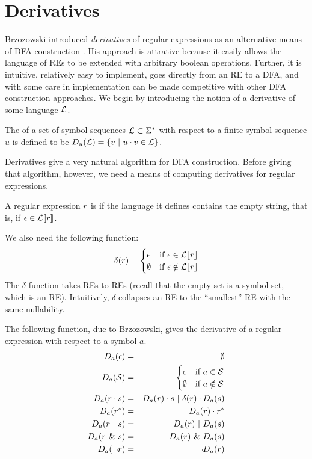 \section{Derivatives}\label{sec:derivatives}

Brzozowski introduced \emph{derivatives} of regular expressions as an alternative means of DFA construction \cite{derivatives}.  His approach is attrative because it easily allows the language of REs to be extended with arbitrary boolean operations.  Further, it is intuitive, relatively easy to implement, goes directly from an RE to a DFA, and with some care in implementation can be made competitive with other DFA construction approaches.  We begin by introducing the notion of a derivative of some language $\mathcal{L}$.

\begin{definition}  The  of a set of symbol sequences $\mathcal{L} \subset \Sigma^*$ with respect to a finite symbol sequence $u$ is defined to be $D_u(\mathcal{L}) = \{ v \ | \ u\cdot v \in \mathcal{L} \}$.
\end{definition} 

Derivatives give a very natural algorithm for DFA construction.  Before giving that algorithm, however, we need a means of computing derivatives for regular expressions.

\begin{definition} A regular expression $r$ is  if the language it defines contains the empty string, that is, if $\epsilon \in \mathcal{L}[ \! [ r ] \! ]$.
\end{definition}

We also need the following function:
\[ \delta(r) =
    \begin{cases}
        \epsilon & \textrm{if} \ \epsilon \in \mathcal{L}[ \! [ r ] \! ] \\
        \emptyset & \textrm{if} \ \epsilon \notin \mathcal{L}[ \! [ r ] \! ]
    \end{cases}
\]
The $\delta$ function takes REs to REs (recall that the empty set is a symbol set, which is an RE).  Intuitively, $\delta$ collapses an RE to the ``smallest'' RE with the same nullability.

The following function, due to Brzozowski, gives the derivative of a regular expression with respect to a symbol $a$.  
\begin{eqnarray*}
D_a (\epsilon)  &=& \emptyset \\
D_a (\mathcal{S})         &=& 
    \begin{cases}
        \epsilon & \textrm{if} \ a \in \mathcal{S} \\
        \emptyset & \textrm{if} \ a \notin \mathcal{S} \\
    \end{cases} \\
D_a (r \cdot s) &=& D_a(r)\cdot s \ | \  \delta(r) \cdot D_a(s) \\
D_a (r^*)       &=& D_a(r) \cdot r^* \\
D_a (r \ | \  s)   &=& D_a(r) \ | \  D_a(s) \\
D_a (r \ \& \  s)  &=& D_a(r) \ \& \  D_a(s) \\
D_a (\neg r)    &=& \neg D_a(r)
\end{eqnarray*}

